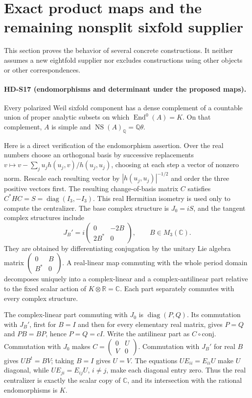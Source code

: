 \section{Exact product maps and the remaining nonsplit sixfold supplier}

This section proves the behavior of several concrete constructions.
It neither assumes a new eightfold supplier nor excludes constructions
using other objects or other correspondences.

\paragraph{HD-S17 (endomorphisms and determinant under the proposed maps).}
Every polarized Weil sixfold component has a dense complement of a
countable union of proper analytic subsets on which
\(\operatorname{End}^0(A)=K\). On that complement, \(A\) is simple
and \(\operatorname{NS}(A)_\mathbb Q=\mathbb Q\theta\).

Here is a direct verification of the endomorphism assertion. Over the
real numbers choose an orthogonal basis by successive replacements
\(v\mapsto v-\sum_j u_jh(u_j,v)/h(u_j,u_j)\), choosing at
each step a vector of nonzero norm. Rescale each resulting vector
by \(|h(u_j,u_j)|^{-1/2}\) and order the three positive vectors
first. The resulting change-of-basis matrix \(C\) satisfies
\(C^*HC=S=\operatorname{diag}(I_3,-I_3)\). This real
Hermitian isometry is used only to compute the centralizer.
The base complex structure is \(J_0=iS\), and the tangent complex
structures include
\[
 J_B'=i\begin{pmatrix}0&-2B\\2B^*&0\end{pmatrix},
 \qquad B\in M_3(\mathbb C).
\]
They are obtained by differentiating conjugation by the unitary Lie
algebra matrix \(\left(\begin{smallmatrix}0&B\\B^*&0\end{smallmatrix}\right)\).
A real-linear map commuting with the whole period domain decomposes
uniquely into a complex-linear and a complex-antilinear part relative
to the fixed scalar action of \(K\otimes\mathbb R=\mathbb C\).
Each part separately commutes with every complex structure.

The complex-linear part commuting with \(J_0\) is
\(\operatorname{diag}(P,Q)\). Its commutation with \(J_B'\), first
for \(B=I\) and then for every elementary real matrix, gives
\(P=Q\) and \(PB=BP\), hence \(P=Q=cI\).
Write the antilinear part as \(C\circ\mathrm{conj}\).
Commutation with \(J_0\) makes
\(C=\left(\begin{smallmatrix}0&U\\V&0\end{smallmatrix}\right)\).
Commutation with \(J_B'\) for real \(B\) gives
\(UB^t=BV\); taking \(B=I\) gives \(U=V\).
The equations \(UE_{ii}=E_{ii}U\) make \(U\) diagonal, while
\(UE_{ji}=E_{ij}U\), \(i\ne j\), make each diagonal entry zero.
Thus the real centralizer is exactly the scalar copy of \(\mathbb C\),
and its intersection with the rational endomorphisms is \(K\).


